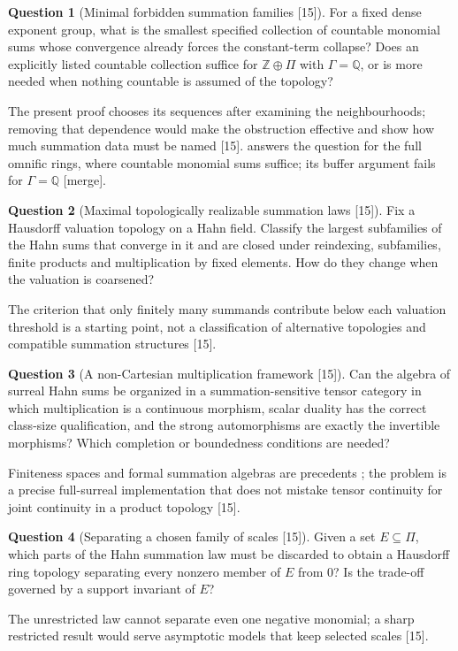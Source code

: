 \documentclass[11pt,oneside]{article}
\numberwithin{equation}{section}
\theoremstyle{definition}
\newtheorem{question}[question]{Question}
\theoremstyle{remark}
\newcommand{\Q}{\mathbb Q}
\newcommand{\Z}{\mathbb Z}
\newcommand{\src}[1]{\textup{\textsf{\small[#1]}}}
\newcommand{\mergetag}{\textup{\textsf{\small[merge]}}}
\begin{document}
\begin{question}[Minimal forbidden summation families \src{15}]\label{opa:tc:q:minimal}
For a fixed dense exponent group, what is the smallest specified collection of countable monomial sums
whose convergence already forces the constant-term collapse? Does an explicitly listed countable collection
suffice for $\Z\oplus\Pi$ with $\Gamma=\Q$, or is more needed when nothing countable is assumed of the topology?
\end{question}
The present proof chooses its sequences after examining the neighbourhoods; removing that dependence would
make the obstruction effective and show how much summation data must be named \src{15}.
 answers the question for the full omnific rings, where countable
monomial sums suffice; its buffer argument fails for $\Gamma=\Q$ \mergetag.

\begin{question}[Maximal topologically realizable summation laws \src{15}]\label{opa:tc:q:maximal}
Fix a Hausdorff valuation topology on a Hahn field. Classify the largest subfamilies of the Hahn sums that
converge in it and are closed under reindexing, subfamilies, finite products and multiplication by fixed
elements. How do they change when the valuation is coarsened?
\end{question}
The criterion that only finitely many summands contribute below each valuation threshold is a starting
point, not a classification of alternative topologies and compatible summation structures \src{15}.

\begin{question}[A non-Cartesian multiplication framework \src{15}]\label{opa:tc:q:tensor}
Can the algebra of surreal Hahn sums be organized in a summation-sensitive tensor category in which
multiplication is a continuous morphism, scalar duality has the correct class-size qualification, and the
strong automorphisms are exactly the invertible morphisms? Which completion or boundedness conditions are
needed?
\end{question}
Finiteness spaces and formal summation algebras are precedents \cite{BCJS,BKKPS}; the problem is a precise
full-surreal implementation that does not mistake tensor continuity for joint continuity in a product
topology \src{15}.

\begin{question}[Separating a chosen family of scales \src{15}]\label{opa:tc:q:scales}
Given a set $E\subseteq\Pi$, which parts of the Hahn summation law must be discarded to obtain a Hausdorff ring
topology separating every nonzero member of $E$ from $0$? Is the trade-off governed by a support invariant
of $E$?
\end{question}
The unrestricted law cannot separate even one negative monomial; a sharp restricted result would serve
asymptotic models that keep selected scales \src{15}.
\end{document}
